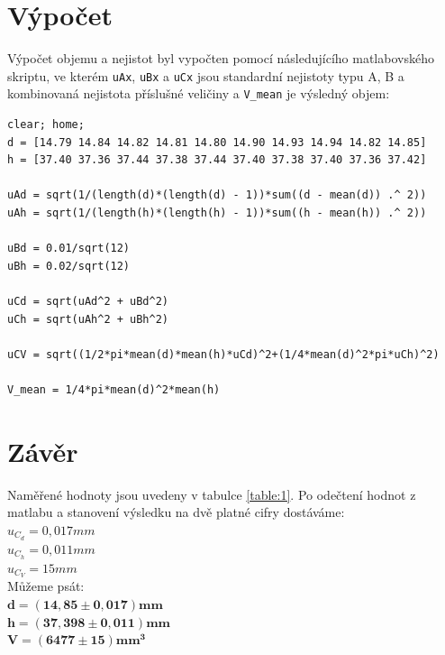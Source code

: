 \documentclass[a4paper]{article}
\begin{document}
\section{Výpočet}
Výpočet objemu a nejistot byl vypočten pomocí následujícího matlabovského skriptu, ve kterém \verb|uAx|, \verb|uBx| a \verb|uCx| jsou standardní nejistoty typu A, B a kombinovaná nejistota příslušné veličiny a \verb|V_mean| je výsledný objem:
\newpage
\begin{verbatim}
clear; home;
d = [14.79 14.84 14.82 14.81 14.80 14.90 14.93 14.94 14.82 14.85]
h = [37.40 37.36 37.44 37.38 37.44 37.40 37.38 37.40 37.36 37.42]

uAd = sqrt(1/(length(d)*(length(d) - 1))*sum((d - mean(d)) .^ 2))
uAh = sqrt(1/(length(h)*(length(h) - 1))*sum((h - mean(h)) .^ 2))

uBd = 0.01/sqrt(12)
uBh = 0.02/sqrt(12)

uCd = sqrt(uAd^2 + uBd^2)
uCh = sqrt(uAh^2 + uBh^2)

uCV = sqrt((1/2*pi*mean(d)*mean(h)*uCd)^2+(1/4*mean(d)^2*pi*uCh)^2)

V_mean = 1/4*pi*mean(d)^2*mean(h)
\end{verbatim}

\section{Závěr}
Naměřené hodnoty jsou uvedeny v tabulce \ref{table:1}. Po odečtení hodnot z matlabu a stanovení výsledku na dvě platné cifry dostáváme:\\
$u_{C_d} = 0,017 mm$\\
$u_{C_h} = 0,011 mm$\\
$u_{C_V} = 15 mm$\\
Můžeme psát:\\
$\mathbf{d = (14,85 \pm 0,017)mm}$\\
$\mathbf{h = (37,398 \pm 0,011)mm}$\\
$\mathbf{V = (6477 \pm 15)mm^3}$
\end{document}
